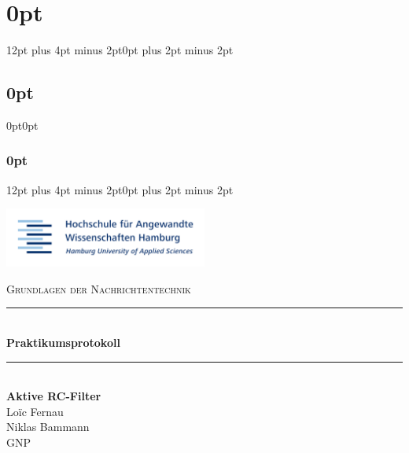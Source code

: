 
\lhead{}
\rhead{}




\usepackage{titlesec}
\titlespacing\section{0pt}{12pt plus 4pt minus 2pt}{0pt plus 2pt minus 2pt}
\titlespacing\subsection{0pt}{0pt}{0pt}
\titlespacing\subsubsection{0pt}{12pt plus 4pt minus 2pt}{0pt plus 2pt minus 2pt}



	

 	\begin{titlepage}
 		\begin{flushright}
			\includegraphics[width=0.5\textwidth]{img/title.png}\\[2cm]
		\end{flushright}
		
		\begin{center}
			\textsc{\Large Grundlagen der Nachrichtentechnik}
			\rule{\linewidth}{0.5mm}\\[1.5cm]
			{ \huge \bfseries Praktikumsprotokoll}
			\rule{\linewidth}{0.5mm}\\[2cm]
			{ \huge \bfseries Aktive RC-Filter}\\[2cm]

			\LARGE Loïc Fernau \\
			\LARGE Niklas Bammann \\[4cm]
			\large GNP
		\end{center}
	\end{titlepage}
	\newpage
	
	\renewcommand{\baselinestretch}{0.8}\normalsize
	\tableofcontents
	\listoffigures
	\listoftables
	\renewcommand{\baselinestretch}{1.0}\normalsize
	
	\newpage

	\setlength{\headsep}{0.4em}
	

	
	
	
	
	
	


	\newpage



